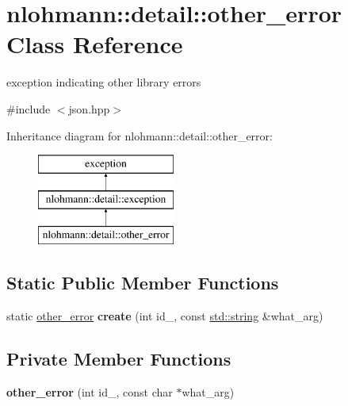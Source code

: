 \hypertarget{classnlohmann_1_1detail_1_1other__error}{}\section{nlohmann\+:\+:detail\+:\+:other\+\_\+error Class Reference}
\label{classnlohmann_1_1detail_1_1other__error}


exception indicating other library errors  




{\ttfamily \#include $<$json.\+hpp$>$}

Inheritance diagram for nlohmann\+:\+:detail\+:\+:other\+\_\+error\+:\begin{figure}[H]
\begin{center}
\leavevmode
\includegraphics[height=3.000000cm]{classnlohmann_1_1detail_1_1other__error}
\end{center}
\end{figure}
\subsection*{Static Public Member Functions}
\begin{DoxyCompactItemize}
\item 
\mbox{\label{classnlohmann_1_1detail_1_1other__error_a87e8ab894e8c85c0d97a0919782d3683}} 
static \mbox{\hyperlink{classnlohmann_1_1detail_1_1other__error}{other\+\_\+error}} {\bfseries create} (int id\+\_\+, const \mbox{\hyperlink{namespacenlohmann_1_1detail_a1ed8fc6239da25abcaf681d30ace4985ab45cffe084dd3d20d928bee85e7b0f21}{std\+::string}} \&what\+\_\+arg)
\end{DoxyCompactItemize}
\subsection*{Private Member Functions}
\begin{DoxyCompactItemize}
\item 
\mbox{\label{classnlohmann_1_1detail_1_1other__error_adf9227d6ca5161508f6a598a0dc6e7cd}} 
{\bfseries other\+\_\+error} (int id\+\_\+, const char $\ast$what\+\_\+arg)
\end{DoxyCompactItemize}
